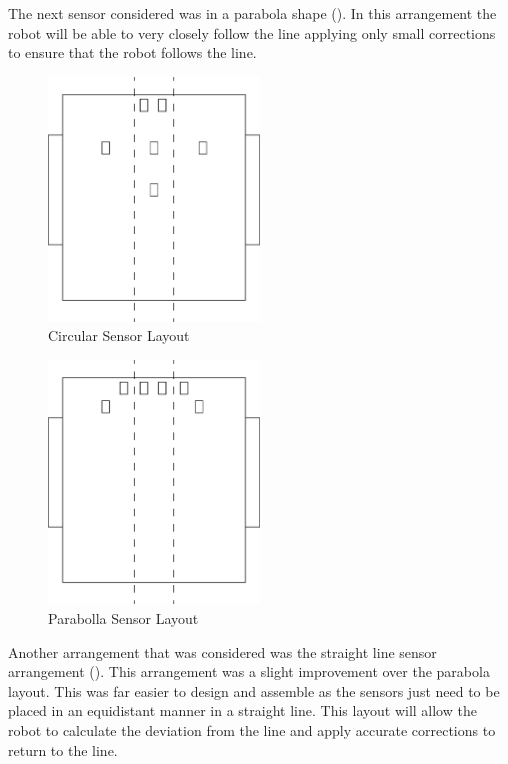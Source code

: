 \documentclass{article}
\begin{document}
The next sensor considered was in a parabola shape (). In this arrangement the robot will be able to very closely follow the line applying only small corrections to ensure that the robot follows the line.

\begin{figure}[!h]
\centerline{\includegraphics[width=0.5\textwidth]{circular_sensor}}
\caption{Circular Sensor Layout}
\label{fig:circular_sensor}
\end{figure}

\begin{figure}[!h]
\centerline{\includegraphics[width=0.5\textwidth]{parabola_sensor}}
\caption{Parabolla Sensor Layout}
\label{fig:parabola_sensor}
\end{figure}

Another arrangement that was considered was the straight line sensor arrangement (). This arrangement was a slight improvement over the parabola layout. This was far easier to design and assemble as the sensors just need to be placed in an equidistant manner in a straight line. This layout will allow the robot to calculate the deviation from the line and apply accurate corrections to return to the line.
\end{document}

